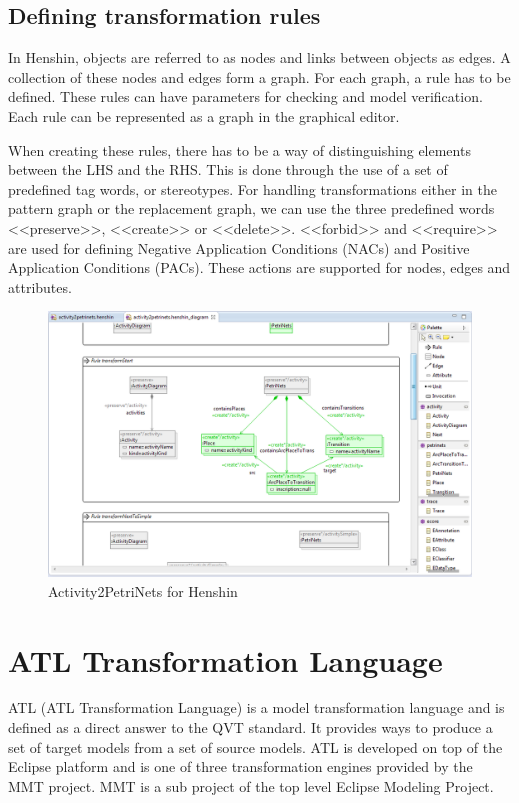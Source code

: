 \documentclass[pdftex,11pt,a4paper]{article}
\begin{document}
\subsection{Defining transformation rules}

\noindent In Henshin, objects are referred to as nodes and links between objects
as edges. A collection of these nodes and edges form a graph. For each graph, a
rule has to be defined. These rules can have parameters for checking and model
verification. Each rule can be represented as a graph in the graphical
editor. 

\indent When creating these rules, there has to be a way of
distinguishing elements between the LHS and the RHS. This is done through the
use of a set of predefined tag words, or stereotypes. For handling transformations
either in the pattern graph or the replacement graph, we can use the three
predefined words <<preserve>>, <<create>> or <<delete>>. <<forbid>> and
<<require>> are used for defining Negative Application Conditions (NACs) and
Positive Application Conditions (PACs). These actions are supported for nodes,
edges and attributes. 

\begin{figure}[H]
	\centering
	\includegraphics[scale=0.5]{figures/HenshinScreen.png}
	\caption{Activity2PetriNets for Henshin}
	\label{fig:HenshinScreen}
\end{figure}

\section{ATL Transformation Language}

\noindent ATL\cite{ATL} (ATL Transformation Language) is a model transformation
language and is defined as a direct answer to the QVT\cite{QVT} standard. It
provides ways to produce a set of target models from a set of source models.
ATL is developed on top of the Eclipse platform and is one of three
transformation engines provided by the MMT project\cite{MMT}. MMT is a sub
project of the top level Eclipse Modeling Project\cite{EMP}.
\end{document}
